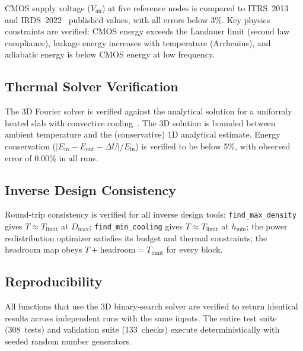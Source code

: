 \documentclass[11pt,twocolumn]{article}
\begin{document}
CMOS supply voltage ($V_{dd}$) at five reference nodes is compared to
ITRS~2013~\cite{itrs2013} and IRDS~2022~\cite{irds2022} published
values, with all errors below 3\%. Key physics constraints are verified:
CMOS energy exceeds the Landauer limit (second law compliance), leakage
energy increases with temperature (Arrhenius), and adiabatic energy is
below CMOS energy at low frequency.

\subsection{Thermal Solver Verification}

The 3D Fourier solver is verified against the analytical solution for a
uniformly heated slab with convective cooling~\cite{carslaw1959}. The
3D solution is bounded between ambient temperature and the
(conservative) 1D analytical estimate. Energy conservation
($|E_{\mathrm{in}} - E_{\mathrm{out}} - \Delta U| / E_{\mathrm{in}}$)
is verified to be below 5\%, with observed error of 0.00\% in all runs.

\subsection{Inverse Design Consistency}

Round-trip consistency is verified for all inverse design tools:
\texttt{find\_max\_density} gives $T \approx T_{\mathrm{limit}}$ at
$D_{\max}$; \texttt{find\_min\_cooling} gives $T \approx
T_{\mathrm{limit}}$ at $h_{\min}$; the power redistribution optimizer
satisfies its budget and thermal constraints; the headroom map obeys
$T + \text{headroom} = T_{\mathrm{limit}}$ for every block.

\subsection{Reproducibility}

All functions that use the 3D binary-search solver are verified to
return identical results across independent runs with the same inputs.
The entire test suite (308~tests) and validation suite (133~checks)
execute deterministically with seeded random number generators.
\end{document}
